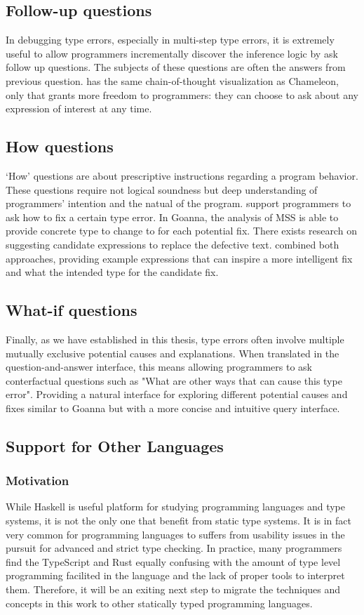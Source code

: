 \subsection{Follow-up questions}
In debugging type errors, especially in multi-step type errors, it is extremely useful to allow programmers incrementally discover the inference logic by ask follow up questions. The subjects of these questions are often the answers from previous question. \toolname{} has the same chain-of-thought visualization as Chameleon, only that \toolname{} grants more freedom to programmers: they can choose to ask about any expression of interest at any time.

\subsection{How questions}
`How' questions are about prescriptive instructions regarding a program behavior. These questions require not logical soundness but deep understanding of programmers' intention and the natual of the program. \toolname support programmers to ask how to fix a certain type error. In Goanna, the analysis of MSS is able to provide concrete type to change to for each potential fix. There exists research \cite{Lerner2007-mu} on suggesting candidate expressions to replace the defective text.  \toolname{} combined both approaches, providing  
example expressions that can inspire a more intelligent fix and what the intended type for the candidate fix. 

\subsection{What-if questions}
Finally, as we have established in this thesis, type errors often involve multiple mutually exclusive potential causes and explanations. When translated in the question-and-answer interface, this means allowing programmers to ask conterfactual questions such as "What are other ways that can cause this type error". Providing a natural interface for exploring different potential causes and fixes similar to Goanna but with a more concise and intuitive query interface.

\subsection{Support for Other Languages}
\subsubsection{Motivation}
While Haskell is useful platform for studying programming languages and type systems, it is not the only one that benefit from static type systems. It is in fact very common for programming languages to suffers from usability issues in the pursuit for advanced and strict type checking. In practice, many programmers find the TypeScript and Rust equally confusing with the amount of type level programming facilited in the language and the lack of proper tools to interpret them. Therefore, it will be an exiting next step to migrate the techniques and concepts in this work to other statically typed programming languages. 

